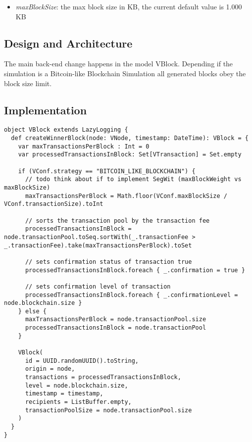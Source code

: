 \begin{itemize}
\item \textit{maxBlockSize}: the max block size in KB, the current default value is 1.000 KB
\end{itemize}

\subsection{Design and Architecture}
The main back-end change happens in the model VBlock. Depending if the simulation is a Bitcoin-like Blockchain Simulation all generated blocks obey the block size limit. 

\subsection{Implementation}

\begin{minipage}{\linewidth}
\begin{lstlisting}[style=myScalastyle]
object VBlock extends LazyLogging {
  def createWinnerBlock(node: VNode, timestamp: DateTime): VBlock = {
    var maxTransactionsPerBlock : Int = 0
    var processedTransactionsInBlock: Set[VTransaction] = Set.empty

    if (VConf.strategy == "BITCOIN_LIKE_BLOCKCHAIN") {
      // todo think about if to implement SegWit (maxBlockWeight vs maxBlockSize)
      maxTransactionsPerBlock = Math.floor(VConf.maxBlockSize / VConf.transactionSize).toInt

      // sorts the transaction pool by the transaction fee
      processedTransactionsInBlock = node.transactionPool.toSeq.sortWith(_.transactionFee > _.transactionFee).take(maxTransactionsPerBlock).toSet

      // sets confirmation status of transaction true
      processedTransactionsInBlock.foreach { _.confirmation = true }

      // sets confirmation level of transaction
      processedTransactionsInBlock.foreach { _.confirmationLevel = node.blockchain.size }
    } else {
      maxTransactionsPerBlock = node.transactionPool.size
      processedTransactionsInBlock = node.transactionPool
    }

    VBlock(
      id = UUID.randomUUID().toString,
      origin = node,
      transactions = processedTransactionsInBlock,
      level = node.blockchain.size,
      timestamp = timestamp,
      recipients = ListBuffer.empty,
      transactionPoolSize = node.transactionPool.size
    )
  }
}
\end{lstlisting}
\end{minipage}

